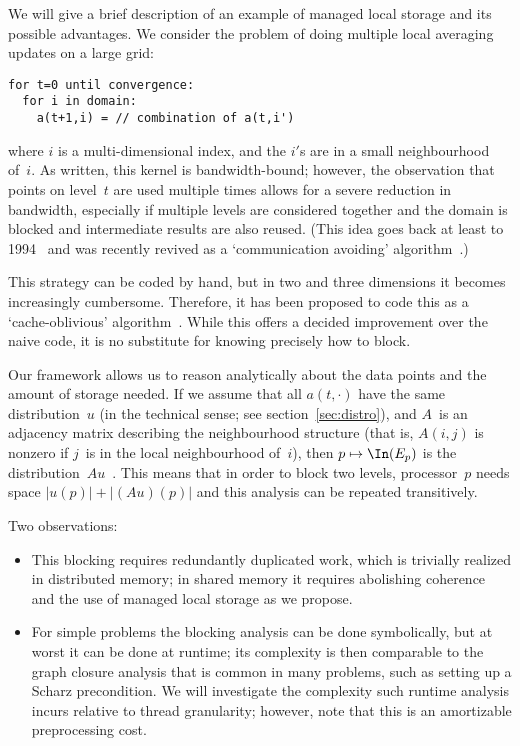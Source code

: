 We will give a brief description of an example of managed local
storage and its possible advantages. We consider the problem of doing
multiple local averaging updates on a large grid:
\begin{verbatim}
for t=0 until convergence:
  for i in domain:
    a(t+1,i) = // combination of a(t,i')
\end{verbatim}
where $i$ is a multi-dimensional index, and the $i'$s are in a small
neighbourhood of~$i$. As written, this kernel is bandwidth-bound;
however, the observation that points on level~$t$ are used multiple
times allows for a severe reduction in bandwidth, especially if
multiple levels are considered together and the domain is blocked and
intermediate results are also reused. (This idea goes back at least to
1994~\cite{OpJo:improved-ssor} and was recently revived as a
`communication avoiding' algorithm~\cite{Demmel2008IEEE:avoiding}.)

This strategy can be coded by
hand, but in two and three dimensions it becomes increasingly
cumbersome. Therefore, it has been proposed to code this as a
`cache-oblivious' algorithm~\cite{Prokop:masters1999}. While this
offers a decided improvement over the naive code, it is no substitute
for knowing precisely how to block.

Our framework allows us to reason analytically about the data points
and the amount of
storage needed.  If we assume that all $a(t,\cdot)$ have the same
distribution~$u$ (in the technical sense; see
section~\ref{sec:distro}), and $A$~is an adjacency matrix describing
the neighbourhood structure (that is, $A(i,j)$ is nonzero if $j$~is in
the local neighbourhood of~$i$), then $p\mapsto\In(E_p)$ is the
distribution~$Au$~\cite{Eijkhout:WCECSbook2013}. This means that in
order to block two levels, processor~$p$ needs space
$|u(p)|+|(Au)(p)|$ and this analysis can be repeated transitively.

Two observations:
\begin{itemize}
\item This blocking requires redundantly duplicated work, which is
  trivially realized in distributed memory; in shared memory it
  requires abolishing coherence and the use of managed local storage
  as we propose.
\item For simple problems the blocking analysis can be done symbolically, but
  at worst it can be done at runtime; its complexity is then comparable 
  to the graph closure analysis that is common in many problems, such as
  setting up a Scharz precondition. We will investigate the complexity such
  runtime analysis incurs relative to thread granularity; however, note that this
  is an amortizable preprocessing cost.
\end{itemize}
